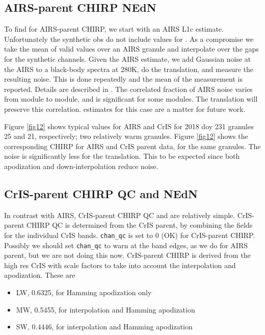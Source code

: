 \documentclass[12pt]{article}
\begin{document}
\subsection{AIRS-parent CHIRP NEdN}

To find {\nedn} for AIRS-parent CHIRP, we start with an AIRS L1c
{\nedn} estimate.  Unfortunately the synthetic obs do not include
values for {\nedn}.  As a compromise we take the mean of valid
{\nedn} values over an AIRS granule and interpolate over the gaps
for the synthetic channels.  Given the AIRS estimate, we add
Gaussian noise at the AIRS {\nedn} to a black-body spectra at 280K,
do the translation, and measure the resulting noise.  This is done
repeatedly and the mean of the measurement is reported.  Details are
described in \cite{mott2018}.  The correlated fraction of AIRS noise
varies from module to module, and is significant for some modules.
The translation will preserve this correlation.  {\nedn} estimates
for this case are a matter for future work.

Figure \ref{fig12} shows typical values for AIRS and CrIS {\nedn}
for 2018 doy 231 granules 25 and 21, respectively; two relatively
warm granules.  Figure \ref{fig12} shows the corresponding CHIRP
{\nedn} for AIRS and CrIS parent data, for the same granules.
The noise is significantly less for the translation.  This to be
expected since both apodization and down-interpolation reduce noise.

\subsection{CrIS-parent CHIRP QC and NEdN}

In contrast with AIRS, CrIS-parent CHIRP QC and {\nedn} are
relatively simple.  CrIS-parent CHIRP QC is determined from the CrIS
parent, by combining the fields for the individual CrIS bands.
\texttt{chan\_qc} is set to 0 (OK) for CrIS-parent CHIRP.  Possibly
we should set \texttt{chan\_qc} to warn at the band edges, as we do
for AIRS parent, but we are not doing this now.  CrIS-parent CHIRP
{\nedn} is derived from the high res CrIS {\nedn} with scale factors
to take into account the interpolation and apodization.  These are
\begin{itemize}
   \item LW, 0.6325, for Hamming apodization only
   \item MW, 0.5455, for interpolation and Hamming apodization
   \item SW, 0.4446, for interpolation and Hamming apodization
\end{itemize}
\end{document}
